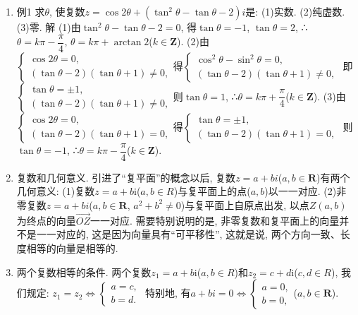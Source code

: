 \documentclass[10pt,a4paper]{article}
\begin{document}
\begin{enumerate}[1.]


\item 例1  求$\theta$, 使复数$z=\cos 2\theta +(\tan ^2\theta -\tan \theta -2)i$是:
(1)实数.			(2)纯虚数.			(3)零.
解  (1)由$\tan ^2\theta -\tan \theta -2=0$, 得$\tan \theta =-1$, $\tan \theta =2$,
∴$\theta =k\pi -\dfrac{\pi }4$, $\theta =k\pi +\arctan 2$($k\in \mathbf{Z}$).
(2)由$\begin{cases} \cos 2\theta =0, \\ (\tan \theta -2)(\tan \theta +1)\ne 0, \end{cases}$得$\begin{cases} \cos ^2\theta -\sin ^2\theta =0, \\ (\tan \theta -2)(\tan \theta +1)\ne 0, \end{cases}$
即$\begin{cases} \tan \theta =\pm 1, \\ (\tan \theta -2)(\tan \theta +1)\ne 0, \end{cases}$则$\tan \theta =1$, ∴$\theta =k\pi +\dfrac{\pi }4$($k\in \mathbf{Z}$).
(3)由$\begin{cases} \cos 2\theta =0, \\ (\tan \theta -2)(\tan \theta +1)=0, \end{cases}$得$\begin{cases} \tan \theta =\pm 1, \\ (\tan \theta -2)(\tan \theta +1)=0, \end{cases}$
则$\tan \theta =-1$, ∴$\theta =k\pi -\dfrac{\pi }4$($k\in \mathbf{Z}$).
\item 复数和几何意义.
引进了``复平面''的概念以后, 复数$z=a+bi$($a,b\in \mathbf{R}$)有两个几何意义:
(1)复数$z=a+b\mathrm{i}$($a,b\in R$)与复平面上的点($a,b$)以一一对应.
(2)非零复数$z=a+bi$($a,b\in \mathbf{R}$, $a^2+b^2\ne 0$)与复平面上自原点出发, 以点$Z(a,b)$为终点的向量$\overrightarrow{OZ}$一一对应.
需要特别说明的是, 非零复数和复平面上的向量并不是一一对应的, 这是因为向量具有``可平移性'', 这就是说, 两个方向一致、长度相等的向量是相等的.
\item 两个复数相等的条件.
两个复数$z_1=a+b\mathrm{i}$($a,b\in R$)和$z_2=c+d\mathrm{i}$($c,d\in R$), 我们规定:
$z_1=z_2\Leftrightarrow \begin{cases} a=c, \\ b=d. \end{cases}$
特别地, 有$a+bi=0\Leftrightarrow \begin{cases} a=0, \\ b=0, \end{cases}$($a,b\in \mathbf{R}$).

\end{enumerate}
\end{document}
